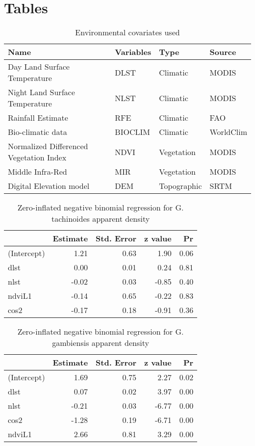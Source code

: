 \documentclass[10pt]{article}
\begin{document}
\section*{Tables}
\label{unnumbered-24}



\begin{table}[htb]
\caption{Environmental covariates used}
\centering
\begin{tabular}{llll}
Name & Variables & Type & Source\\
\hline
Day Land Surface Temperature & DLST & Climatic & MODIS\\
Night Land Surface Temperature & NLST & Climatic & MODIS\\
Rainfall Estimate & RFE & Climatic & FAO\\
Bio-climatic data & BIOCLIM & Climatic & WorldClim\\
Normalized Differenced Vegetation Index & NDVI & Vegetation & MODIS\\
Middle Infra-Red & MIR & Vegetation & MODIS\\
Digital Elevation model & DEM & Topographic & SRTM\\
\end{tabular}
\end{table}
\begin{table}[htb]
\caption{Zero-inflated negative binomial regression for G. tachinoides apparent density}
\centering
\begin{tabular}{lrrrr}
 & Estimate & Std. Error & z value & Pr\\
\hline
(Intercept) & 1.21 & 0.63 & 1.90 & 0.06\\
dlst & 0.00 & 0.01 & 0.24 & 0.81\\
nlst & -0.02 & 0.03 & -0.85 & 0.40\\
ndviL1 & -0.14 & 0.65 & -0.22 & 0.83\\
cos2 & -0.17 & 0.18 & -0.91 & 0.36\\
\end{tabular}
\end{table}
\begin{table}[htb]
\caption{Zero-inflated negative binomial regression for G. gambiensis apparent density}
\centering
\begin{tabular}{lrrrr}
 & Estimate & Std. Error & z value & Pr\\
\hline
(Intercept) & 1.69 & 0.75 & 2.27 & 0.02\\
dlst & 0.07 & 0.02 & 3.97 & 0.00\\
nlst & -0.21 & 0.03 & -6.77 & 0.00\\
cos2 & -1.28 & 0.19 & -6.71 & 0.00\\
ndviL1 & 2.66 & 0.81 & 3.29 & 0.00\\
\end{tabular}
\end{table}
\end{document}
